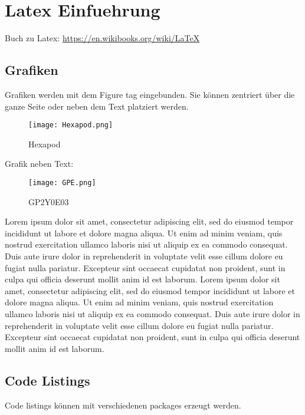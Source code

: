 \chapter{Latex Einfuehrung}

Buch zu Latex: \url{https://en.wikibooks.org/wiki/LaTeX}

\section{Grafiken}


Grafiken werden mit dem Figure tag eingebunden. Sie können zentriert über die ganze Seite oder neben dem Text platziert werden.

\begin{figure}[h]
\begin{center}
\texttt{[image: Hexapod.png]}
\caption{Hexapod}
\label{fig:hexapod}
\end{center}
\end{figure}

Grafik neben Text:

\begin{wrapfigure}{R}{0.5\linewidth}
\texttt{[image: GPE.png]}
\caption{GP2Y0E03 \cite{GP2Y0E03}}
\label{fig:GPE}
\end{wrapfigure}

Lorem ipsum dolor sit amet, consectetur adipiscing elit, sed do eiusmod tempor incididunt ut labore et dolore magna aliqua. Ut enim ad minim veniam, quis nostrud exercitation ullamco laboris nisi ut aliquip ex ea commodo consequat. Duis aute irure dolor in reprehenderit in voluptate velit esse cillum dolore eu fugiat nulla pariatur. Excepteur sint occaecat cupidatat non proident, sunt in culpa qui officia deserunt mollit anim id est laborum. 
Lorem ipsum dolor sit amet, consectetur adipiscing elit, sed do eiusmod tempor incididunt ut labore et dolore magna aliqua. Ut enim ad minim veniam, quis nostrud exercitation ullamco laboris nisi ut aliquip ex ea commodo consequat. Duis aute irure dolor in reprehenderit in voluptate velit esse cillum dolore eu fugiat nulla pariatur. Excepteur sint occaecat cupidatat non proident, sunt in culpa qui officia deserunt mollit anim id est laborum. 


\section{Code Listings}
Code listings können mit verschiedenen packages erzeugt werden.

